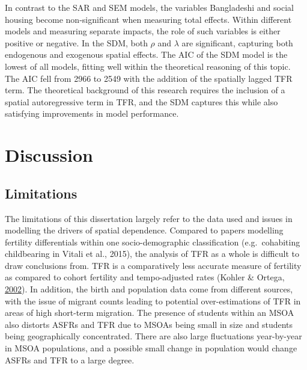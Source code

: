 \documentclass[12pt,twoside]{reedthesis}
\begin{document}
In contrast to the SAR and SEM models, the variables Bangladeshi and social housing become non-significant when measuring total effects. Within different models and measuring separate impacts, the role of such variables is either positive or negative. In the SDM, both \(\rho\) and \(\lambda\) are significant, capturing both endogenous and exogenous spatial effects. The AIC of the SDM model is the lowest of all models, fitting well within the theoretical reasoning of this topic. The AIC fell from 2966 to 2549 with the addition of the spatially lagged TFR term. The theoretical background of this research requires the inclusion of a spatial autoregressive term in TFR, and the SDM captures this while also satisfying improvements in model performance.

\hypertarget{Discussion}{%
\chapter{Discussion}\label{Discussion}}

\hypertarget{limitations}{%
\section{Limitations}\label{limitations}}

The limitations of this dissertation largely refer to the data used and issues in modelling the drivers of spatial dependence. Compared to papers modelling fertility differentials within one socio-demographic classification (e.g.~cohabiting childbearing in Vitali et al., 2015), the analysis of TFR as a whole is difficult to draw conclusions from. TFR is a comparatively less accurate measure of fertility as compared to cohort fertility and tempo-adjusted rates (Kohler \& Ortega, \protect\hyperlink{ref-kohler2002a}{2002}). In addition, the birth and population data come from different sources, with the issue of migrant counts leading to potential over-estimations of TFR in areas of high short-term migration. The presence of students within an MSOA also distorts ASFRs and TFR due to MSOAs being small in size and students being geographically concentrated. There are also large fluctuations year-by-year in MSOA populations, and a possible small change in population would change ASFRs and TFR to a large degree.
\end{document}
